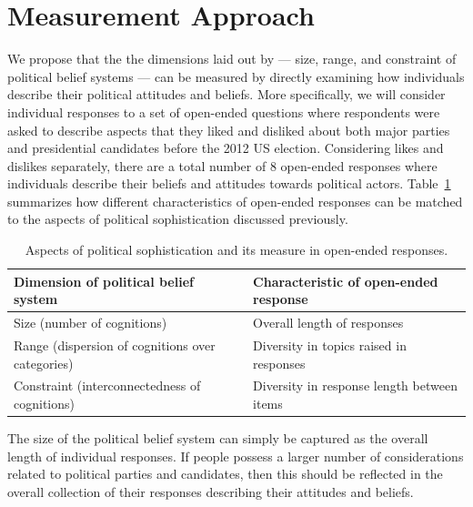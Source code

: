 \documentclass[12pt]{article}
\begin{document}
\section{Measurement Approach}

We propose that the the dimensions laid out by \citet{luskin1987measuring} --- size, range, and constraint of political belief systems --- can be measured by directly examining how individuals describe their political attitudes and beliefs. More specifically, we will consider individual responses to a set of open-ended questions where respondents were asked to describe aspects that they liked and disliked about both major parties and presidential candidates before the 2012 US election. Considering likes and dislikes separately, there are a total number of 8 open-ended responses where individuals describe their beliefs and attitudes towards political actors. Table~\ref{tab:measure} summarizes how different characteristics of open-ended responses can be matched to the aspects of political sophistication discussed previously.

\begin{table}[h]
\begin{tabular}{ll}
\hline 
Dimension of political belief system & Characteristic of open-ended response \\
\hline
Size (number of cognitions) & Overall length of responses \\
Range (dispersion of cognitions over categories) & Diversity in topics raised in responses \\
Constraint (interconnectedness of cognitions) & Diversity in response length between items \\
\hline
\end{tabular}
\caption{Aspects of political sophistication and its measure in open-ended responses.}\label{tab:measure}
\end{table}

The size of the political belief system can simply be captured as the overall length of individual responses. If people possess a larger number of considerations related to political parties and candidates, then this should be reflected in the  overall collection of their responses describing their attitudes and beliefs.
\end{document}
